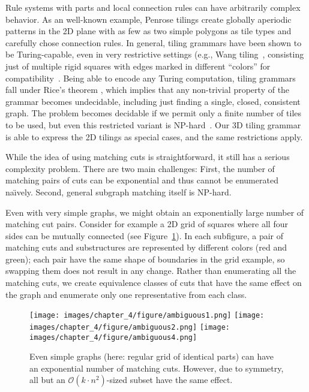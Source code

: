 Rule systems with parts and local connection rules can have arbitrarily complex behavior.
As an well-known example, Penrose tilings create globally aperiodic patterns in the 2D plane with as few as two simple polygons as tile types and carefully chose connection rules. In general, tiling grammars have been shown to be Turing-capable, even in very restrictive settings (e.g., Wang tiling~\cite{Cohen2003}, consisting just of multiple rigid squares with edges marked in different ``colors'' for compatibility~\cite{Berger1966}.
Being able to encode any Turing computation, tiling grammars fall under Rice's theorem \cite{HopcroftUllman79}, which implies that any non-trivial property of the grammar becomes undecidable, including just finding a single, closed, consistent graph. %
The problem becomes decidable if we permit only a finite number of tiles to be used, but even this restricted variant is NP-hard~\cite{Demaine2007}.
Our 3D tiling grammar is able to express the 2D tilings as special cases, and the same restrictions apply.


While the idea of using matching cuts is straightforward, it still has a serious complexity problem. There are two main challenges: First, the number of matching pairs of cuts can be exponential and thus cannot be enumerated na\"{\i}vely. Second, general subgraph matching itself is NP-hard.

Even with very simple graphs, we might obtain an exponentially large number of matching cut pairs. Consider for example a 2D grid of squares where all four sides can be mutually connected (see Figure~\ref{fig:ambiguous}). In each subfigure,
a pair of matching cuts and substructures are represented by different colors (red and green); each pair have the same shape of boundaries in the grid example, so swapping them does not result in any change. Rather than enumerating all the matching cuts, we create equivalence classes of cuts that have the same effect on the graph and enumerate only one representative from each class.

\begin{figure}[t!]
	\centering
	\texttt{[image: images/chapter\_4/figure/ambiguous1.png]}
	\hspace{2mm}
	\texttt{[image: images/chapter\_4/figure/ambiguous2.png]}
	\hspace{2mm}
	\texttt{[image: images/chapter\_4/figure/ambiguous4.png]}	
	\caption{Even simple graphs (here: regular grid of identical parts) can have an exponential number of matching cuts. However, due to symmetry, all but an $\mathcal{O}(k \cdot n^2)$-sized subset have the same effect.}
	\label{fig:ambiguous}
\end{figure}

